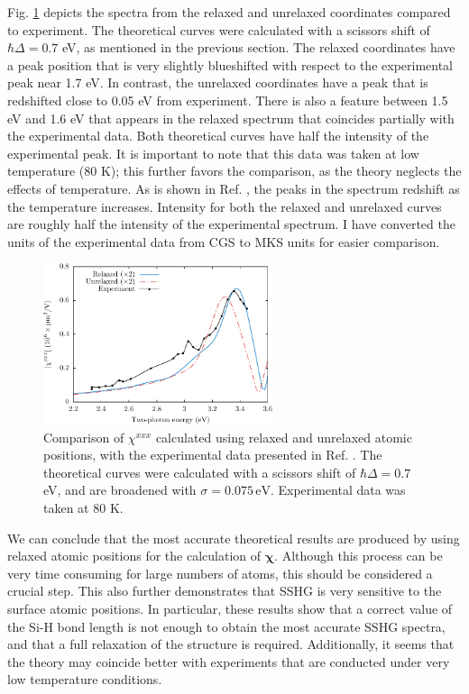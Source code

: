 Fig. \ref{fig:Xxxx} depicts the spectra from the relaxed and unrelaxed
coordinates compared to experiment. The theoretical curves were calculated with
a scissors shift of $\hbar\Delta = 0.7$ eV, as mentioned in the previous
section. The relaxed coordinates have a peak position that is very slightly
blueshifted with respect to the experimental peak near 1.7 eV. In contrast, the
unrelaxed coordinates have a peak that is redshifted close to 0.05 eV from
experiment. There is also a feature between 1.5 eV and 1.6 eV that appears in
the relaxed spectrum that coincides partially with the experimental data. Both
theoretical curves have half the intensity of the experimental peak. It is
important to note that this data was taken at low temperature (80 K); this
further favors the comparison, as the theory neglects the effects of
temperature. As is shown in Ref. \cite{hoferAPA96}, the peaks in the spectrum
redshift as the temperature increases. Intensity for both the relaxed and
unrelaxed curves are roughly half the intensity of the experimental spectrum. I
have converted the units of the experimental data from CGS to MKS units for
easier comparison.

\begin{figure}[H]
\centering
\includegraphics[width=0.6\textwidth]{content/figures/fig-Si1x1-Hofer_Xxxx}
\caption{Comparison of
$\chi^{xxx}$ calculated using relaxed and unrelaxed
atomic positions, with the experimental data presented in Ref.
\cite{hoferAPA96}. The theoretical curves were calculated with a scissors shift
of $\hbar\Delta = 0.7$ eV, and are broadened with $\sigma=0.075\,\text{eV}$.
Experimental data was taken at 80 K.}
\label{fig:Xxxx}
\end{figure}

We can conclude that the most accurate theoretical results are produced by using
relaxed atomic positions for the calculation of $\boldsymbol{\chi}$. Although
this process can be very time consuming for large numbers of atoms, this should
be considered a crucial step. This also further demonstrates that SSHG is very
sensitive to the surface atomic positions. In particular, these results show
that a correct value of the Si-H bond length is not enough to obtain the most
accurate SSHG spectra, and that a full relaxation of the structure is required.
Additionally, it seems that the theory may coincide better with experiments that
are conducted under very low temperature conditions.


